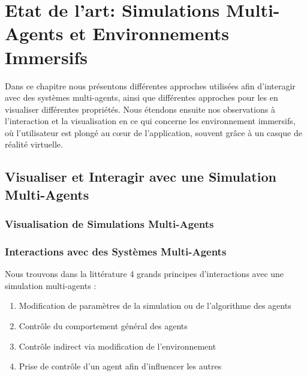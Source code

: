 \chapter{Etat de l'art: Simulations Multi-Agents et Environnements Immersifs}
\label{ChapitreEAVR}

	Dans ce chapitre nous présentons différentes approches utilisées afin d'interagir avec des systèmes multi-agents, ainsi que différentes approches pour les en visualiser différentes propriétés. Nous étendons ensuite nos observations à l'interaction et la visualisation en ce qui concerne les environnement immersifs, où l'utilisateur est plongé au cœur de l'application, souvent grâce à un casque de réalité virtuelle.
	

	\section{Visualiser et Interagir avec une Simulation Multi-Agents}
		
		
		\subsection{Visualisation de Simulations Multi-Agents}
		
		
		\subsection{Interactions avec des Systèmes Multi-Agents}
	
	
		Nous trouvons dans la littérature 4 grands principes d'interactions avec une simulation multi-agents \cite{kolling_human_2016} :
		\begin{enumerate}
			\item Modification de paramètres de la simulation ou de l'algorithme des agents
			\item Contrôle du comportement général des agents
			\item Contrôle indirect via modification de l'environnement
			\item Prise de contrôle d'un agent afin d'influencer les autres
		\end{enumerate}
		
